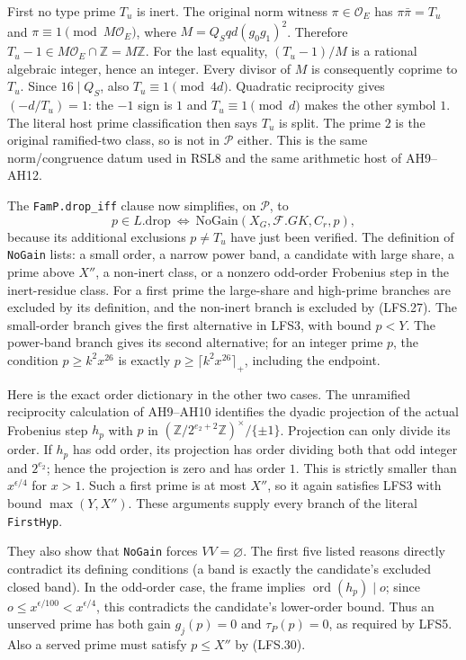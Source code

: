 First no type prime $T_u$ is inert.  The original norm witness
$\pi\in\mathcal O_E$ has $\pi\bar\pi=T_u$ and
$\pi\equiv1\pmod{M\mathcal O_E}$, where
$M=Q_Sqd(g_0g_1)^2$.
Therefore $T_u-1\in M\mathcal O_E\cap\mathbb Z=M\mathbb Z$.
For the last equality, $(T_u-1)/M$ is a rational algebraic
integer, hence an integer.  Every divisor of $M$ is consequently
coprime to $T_u$.  Since $16\mid Q_S$, also $T_u\equiv1\pmod{4d}$.
Quadratic reciprocity gives $(-d/T_u)=1$: the $-1$ sign is $1$
and $T_u\equiv1\pmod d$ makes the other symbol $1$.
The literal host prime classification then says $T_u$ is split.
The prime $2$ is the original ramified-two class, so is not in
$\mathcal P$ either.  This is the same norm/congruence datum
used in RSL8 and the same arithmetic host of AH9--AH12.

The \texttt{FamP.drop\_iff} clause now simplifies, on
$\mathcal P$, to
\[
             p\in L.\mathrm{drop}\ \Longleftrightarrow\
                         \mathrm{NoGain}(X_G,\mathcal F.GK,C_r,p),
                                                               \tag{LFS.30}
\]
because its additional exclusions $p\ne T_u$ have just been
verified.  The definition of \texttt{NoGain} lists: a small
order, a narrow power band, a candidate with large share,
a prime above $X''$, a non-inert class, or a nonzero odd-order
Frobenius step in the inert-residue class.
For a first prime the large-share and high-prime branches are
excluded by its definition, and the non-inert branch is
excluded by (LFS.27).  The small-order branch gives the first
alternative in LFS3, with bound $p<Y$.
The power-band branch gives its second alternative; for an
integer prime $p$, the condition $p\ge k^2x^{26}$ is exactly
$p\ge\lceil k^2x^{26}\rceil_+$, including the endpoint.

Here is the exact order dictionary in the other two cases.
The unramified reciprocity calculation of AH9--AH10 identifies
the dyadic projection of the actual Frobenius step $h_p$ with
$p$ in $(\mathbb Z/2^{e_2+2}\mathbb Z)^\times/\{\pm1\}$.
Projection can only divide its order.  If $h_p$ has odd order,
its projection has order dividing both that odd integer and
$2^{e_2}$; hence the projection is zero and has order $1$.
This is strictly smaller than $x^{\epsilon/4}$ for $x>1$.
Such a first prime is at most $X''$, so it again satisfies
LFS3 with bound $\max(Y,X'')$.  These arguments supply every
branch of the literal \texttt{FirstHyp}.

They also show that \texttt{NoGain} forces $VV=\varnothing$.
The first five listed reasons directly contradict its defining
conditions (a band is exactly the candidate's excluded closed
band).  In the odd-order case, the frame implies
$\operatorname{ord}(h_p)\mid o$; since
$o\le x^{\epsilon/100}<x^{\epsilon/4}$, this contradicts
the candidate's lower-order bound.  Thus an unserved prime has
both gain $g_j(p)=0$ and $\tau_P(p)=0$, as required by LFS5.
Also a served prime must satisfy $p\le X''$ by (LFS.30).

